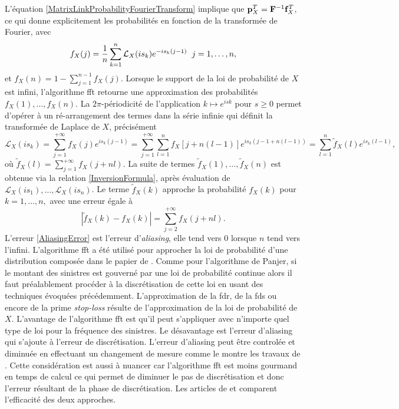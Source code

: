L\rq{}équation \eqref{MatrixLinkProbabilityFourierTransform} implique que $\bold{p}_{X}^{T}=\bold{F}^{-1}\bold{f}_{X}^{T}$, ce qui donne explicitement les probabilités en fonction de la transformée de Fourier, avec
\begin{equation}\label{InversionFormula}
f_{X}(j)=\frac{1}{n}\sum_{k=1}^{n}\mathcal{L}_{X}(is_{k})e^{-is_{k}(j-1)}\hspace{0.2cm} j=1,\ldots,n,
\end{equation}
et $f_{X}(n)=1-\sum_{j=1}^{n-1}f_{X}(j)$. Lorsque le support de la loi de probabilité de $X$ est infini, l\rq{}algorithme \gls{fft} retourne une approximation des probabilités $f_{X}(1),\ldots,f_{X}(n)$. La $2\pi$-périodicité de l\rq{}application $k\mapsto e^{isk}$ pour $s\geq 0$ permet d\rq{}opérer à un ré-arrangement des termes dans la série infinie qui définit la transformée de Laplace de $X$, précisément
\begin{equation}
\mathcal{L}_{X}(is_{k})=\sum_{j=1}^{+\infty}f_{X}(j)e^{is_{k}(j-1)}=\sum_{j=1}^{+\infty}\sum_{l=1}^{n}f_{X}\left[j+n(l-1)\right]e^{is_{k}(j-1+n(l-1))}=\sum_{l=1}^{n}\tilde{f}_{X}(l)e^{is_{k}(l-1)},
\end{equation} 
où $\tilde{f}_{X}(l)=\sum_{j=1}^{+\infty}f_{X}(j+nl)$. La suite de termes $\tilde{f}_{X}(1),\ldots,\tilde{f}_{X}(n)$ est obtenue via la relation \eqref{InversionFormula}, après évaluation de $\mathcal{L}_{X}(is_{1}),\ldots,\mathcal{L}_{X}(is_{n})$. Le terme $\tilde{f}_{X}(k)$ approche la probabilité $f_{X}(k)$ pour $k=1,\ldots,n,$ avec une erreur égale à 
\begin{equation}\label{AliasingError}
\left|\tilde{f}_{X}(k)-f_{X}(k)\right|=\sum_{j=2}^{+\infty}f_{X}(j+nl).
\end{equation}
L'erreur \eqref{AliasingError} est l\rq{}erreur d'\textit{aliasing}, elle tend vers $0$ lorsque $n$ tend vers l'infini. L'algorithme \gls{fft} a été utilisé pour approcher la loi de probabilité d'une distribution composée dans le papier de \citet{HeMe83}. Comme pour l'algorithme de Panjer, si le montant des sinistres est gouverné par une loi de probabilité continue alors il faut préalablement procéder à la discrétisation de cette loi en usant des techniques évoquées précédemment. L\rq{}approximation de la \gls{fdr}, de la \gls{fds} ou encore de la prime \textit{stop-loss} résulte de l\rq{}approximation de la loi de probabilité de $X$. L'avantage de l'algorithme \gls{fft} est qu\rq{}il peut s\rq{}appliquer avec n'importe quel type de loi pour la fréquence des sinistres. Le désavantage est l'erreur d'aliasing qui s\rq{}ajoute à l'erreur de discrétisation. L'erreur d'aliasing peut être controlée et diminuée en effectuant un changement de mesure comme le montre les travaux de \citet{GrHe99}. Cette considération est aussi à nuancer car l'algorithme \gls{fft} est moins gourmand en temps de calcul ce qui permet de diminuer le pas de discrétisation et donc l\rq{}erreur résultant de la phase de discrétisation. Les articles de \citet{Bu84} et \citet{EmFr09} comparent l'efficacité des deux approches. 


